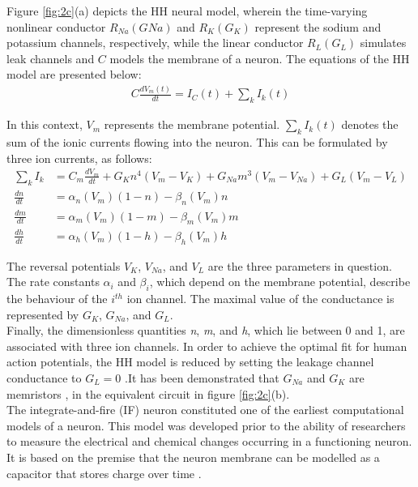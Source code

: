 \noindent Figure \ref{fig:2c}(a) depicts the HH neural model, wherein the time-varying nonlinear conductor $R_{Na}(GNa)$ and $R_K(G_K)$ represent the sodium and potassium channels, respectively, while the linear conductor $R_L(G_L)$ simulates leak channels and $C$ models the membrane of a neuron. The equations of the HH model are presented below: 
\begin{align}
    C \frac{dV_m(t)}{dt} = I_C(t) + \sum_{k}^{}I_k(t) \label{eq:2.1} 
\end{align}

\noindent In this context, $V_m$ represents the membrane potential. $\sum_{k}^{}I_k(t)$ denotes the sum of the ionic currents flowing into the neuron. This can be formulated by three ion currents, as follows:
\begin{align}
    \sum_{k}^{}I_k &= C_m \frac{dV_m}{dt} + G_Kn^4(V_m - V_K) + G_{Na}m^3(V_m - V_{Na}) + G_L (V_m - V_L) \label{eq:2.2} \\
    \frac{dn}{dt} &= \alpha_n(V_m)(1-n)-\beta_n(V_m)n \label{eq:2.3} \\
    \frac{dm}{dt} &= \alpha_m(V_m)(1-m) - \beta_m(V_m)m \label{eq:2.4} \\
    \frac{dh}{dt} &= \alpha_h(V_m)(1-h)-\beta_h(V_m)h \label{eq:2.5}
\end{align}

\noindent The reversal potentials $V_K$, $V_{Na}$, and $V_L$ are the three parameters in question. The rate constants $\alpha_i$ and $\beta_i$, which depend on the membrane potential, describe the behaviour of the $i^{th}$ ion channel. The maximal value of the conductance is represented by $G_K$, $G_{Na}$, and $G_L$. \\

\noindent Finally, the dimensionless quantities \textit{n}, \textit{m}, and \textit{h}, which lie between 0 and 1, are associated with three ion channels. In order to achieve the optimal fit for human action potentials, the HH model is reduced by setting the leakage channel conductance to $G_L = 0$  \cite{noble1962modification}.It has been demonstrated that $G_{Na}$ and $G_K$ are memristors \cite{chua1976memristive}, in the equivalent circuit in figure \ref{fig:2c}(b). \\

\noindent The integrate-and-fire (IF) neuron \cite{lapicque1907louis} constituted one of the earliest computational models of a neuron. This model was developed prior to the ability of researchers to measure the electrical and chemical changes occurring in a functioning neuron. It is based on the premise that the neuron membrane can be modelled as a capacitor that stores charge over time \cite{abbott1999lapicque}.\\

